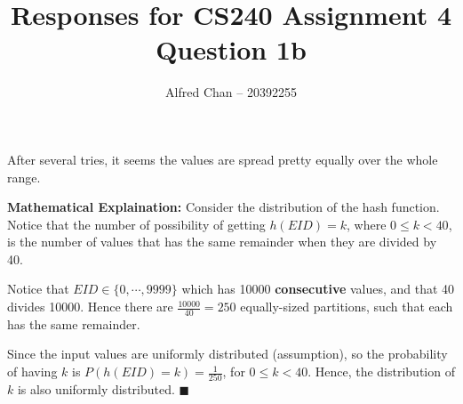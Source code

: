 \documentclass[12pt]{article}
\title{Responses for CS240 Assignment 4 Question 1b}
\author{Alfred Chan -- 20392255}
\begin{document}
\maketitle
After several tries, it seems the values are spread pretty equally over the whole range.

{\bf Mathematical Explaination:} Consider the distribution of the hash function.
Notice that the number of possibility of getting $h(EID) = k$,
where $0 \le k < 40$, is the number of values that has the same remainder when they are divided by 40.

Notice that $EID \in \{0,\cdots,9999\}$ which has 10000 {\bf consecutive} values,
and that 40 divides 10000. Hence there are $\frac{10000}{40}=250$ equally-sized partitions,
such that each has the same remainder.

Since the input values are uniformly distributed (assumption), so the probability of having $k$ is $P(h(EID) = k) = \frac{1}{250}$, for $0 \le k < 40$.
Hence, the distribution of $k$ is also uniformly distributed.
\hfill $\blacksquare$
\end{document}
